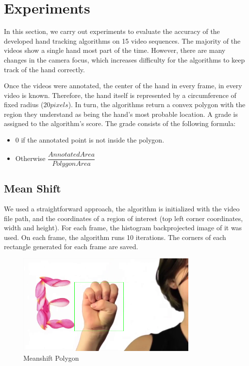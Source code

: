 \documentclass[a4paper]{article}
\begin{document}
\section{Experiments}
In this section, we carry out experiments to evaluate the accuracy of the developed hand tracking algorithms on 15 video sequences. The majority of the videos show a single hand most part of the time. However, there are many changes in the camera focus, which increases difficulty for the algorithms to keep track of the hand correctly. 
\par
Once the videos were annotated, the center of the hand in every frame, in every video is known. Therefore, the hand itself is represented by a circumference of fixed radius ($20 pixels$). In turn, the algorithms return a convex polygon with the region they understand as being the hand's most probable location. A grade is assigned to the algorithm's score. The grade consists of the following formula: 
\begin{itemize}
	\item $0$ if the annotated point is not inside the polygon.
    \item Otherwise $\dfrac{Annotated Area}{Polygon Area}$
\end{itemize}

\subsection{Mean Shift}
We used a straightforward approach, the algorithm is initialized with the video file path, and the coordinates of a region of interest (top left corner coordinates, width and height). For each frame, the histogram backprojected image of it was used. On each frame, the algorithm runs 10 iterations. The corners of each rectangle generated for each frame are saved. 


\begin{figure}[h]
\centering
\includegraphics[width=90mm]{mean.png}
\caption{Meanshift Polygon}
\end{figure}
\end{document}
